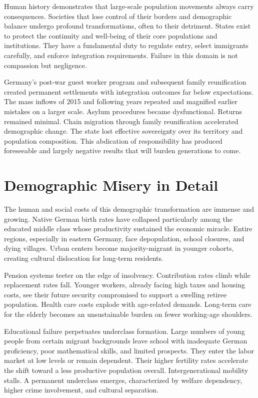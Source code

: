﻿\documentclass[12pt,a4paper]{book}
\begin{document}
Human history demonstrates that large-scale population movements always carry consequences. Societies that lose control of their borders and demographic balance undergo profound transformations, often to their detriment. States exist to protect the continuity and well-being of their core populations and institutions. They have a fundamental duty to regulate entry, select immigrants carefully, and enforce integration requirements. Failure in this domain is not compassion but negligence.

Germany's post-war guest worker program and subsequent family reunification created permanent settlements with integration outcomes far below expectations. The mass inflows of 2015 and following years repeated and magnified earlier mistakes on a larger scale. Asylum procedures became dysfunctional. Returns remained minimal. Chain migration through family reunification accelerated demographic change. The state lost effective sovereignty over its territory and population composition. This abdication of responsibility has produced foreseeable and largely negative results that will burden generations to come.

\section{Demographic Misery in Detail}

The human and social costs of this demographic transformation are immense and growing. Native German birth rates have collapsed particularly among the educated middle class whose productivity sustained the economic miracle. Entire regions, especially in eastern Germany, face depopulation, school closures, and dying villages. Urban centers become majority-migrant in younger cohorts, creating cultural dislocation for long-term residents.

Pension systems teeter on the edge of insolvency. Contribution rates climb while replacement rates fall. Younger workers, already facing high taxes and housing costs, see their future security compromised to support a swelling retiree population. Health care costs explode with age-related demands. Long-term care for the elderly becomes an unsustainable burden on fewer working-age shoulders.

Educational failure perpetuates underclass formation. Large numbers of young people from certain migrant backgrounds leave school with inadequate German proficiency, poor mathematical skills, and limited prospects. They enter the labor market at low levels or remain dependent. Their higher fertility rates accelerate the shift toward a less productive population overall. Intergenerational mobility stalls. A permanent underclass emerges, characterized by welfare dependency, higher crime involvement, and cultural separation.
\end{document}
